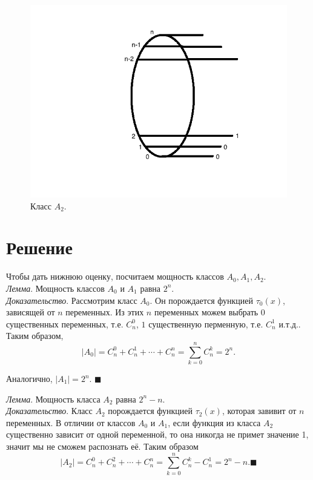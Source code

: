 \documentclass[oneside, final, 12pt]{extreport}
\begin{document}
\begin{figure}[h]
\begin{center}
\begin{minipage}[h]{0.3\linewidth}
 		\includegraphics[width=1\linewidth]{A2}
 		\caption{Класс $A_2$.}
 		\label{ris:A2}
 	\end{minipage}
 	\end{center}
 \end{figure}
	
	\section{Решение} 
	\noindent Чтобы дать нижнюю оценку, посчитаем мощность классов $A_0, A_1, A_2$.\\
	\noindent\emph{Лемма}. Мощность классов $A_0$ и $A_1$ равна $2^n$.\\
	\noindent\emph{Доказательство}. Рассмотрим класс $A_0$. Он порождается функцией $\tau_0(x)$, зависящей от $n$ переменных. Из этих $n$ переменных 
	можем выбрать $0$ существенных переменных, т.е. $C_n^0$, $1$ существенную перменную, т.е. $C_n^1$ и.т.д..
	Таким образом, 
	\[
		|A_0| = C_n^0 + C_n^1 + \cdots + C_n^n = \sum_{k=0}^{n}C_n^k = 2^n.
	 \]	
	
	\noindent Аналогично, $|A_1| = 2^n $. $\blacksquare$ \par
	\bigskip
	\noindent\emph{Лемма}. Мощность класса $A_2$ равна $2^n - n$.\\
	\noindent\emph{Доказательство}. Класс $A_2$ порождается функцией $\tau_2(x)$, которая завивит от $n$ переменных. В отличии от классов $A_0$ и $A_1$,
	если функция из класса $A_2$  существенно зависит от одной переменной, то она никогда не примет значение 1, значит мы не сможем распознать её. Таким образом 
	\[
		|A_2| = C_n^0 + C_n^2 + \cdots + C_n^n = \sum_{k=0}^{n}C_n^k - C_n^1 = 2^n - n. \blacksquare
	\]
	
\end{document}
